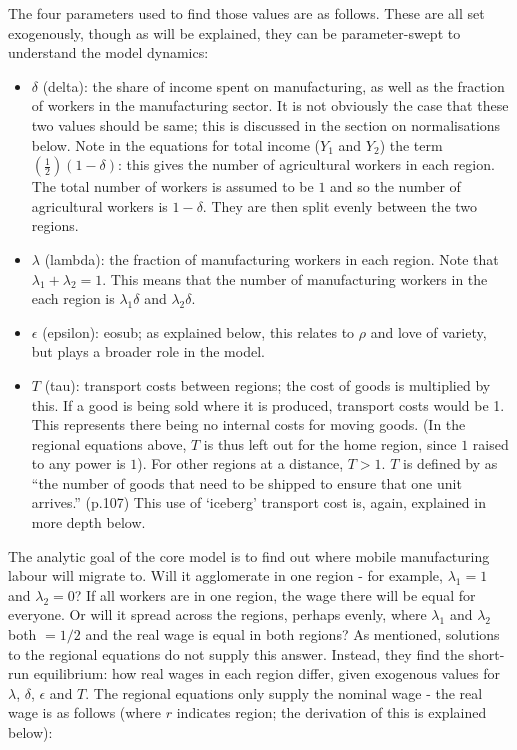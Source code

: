 The four parameters used to find those values are as follows. These are all set exogenously, though as will be explained, they can be parameter-swept to understand the model dynamics:

\begin{itemize}
	\item $\delta$ (delta): the share of income spent on manufacturing, as well as the fraction of workers in the manufacturing sector. It is not obviously the case that these two values should be same; this is discussed in the section on normalisations below. Note in the equations for total income ($Y_{1}$ and $Y_{2}$) the term $(\frac{1}{2})(1-\delta)$: this gives the number of agricultural workers in each region. The total number of workers is assumed to be $1$ and so the number of agricultural workers is $1-\delta$. They are then split evenly between the two regions. 
	\item $\lambda$ (lambda): the fraction of manufacturing workers in each region. Note that $\lambda_{1}+\lambda_{2}=1$.  This means that the number of manufacturing workers in the each region is $\lambda_{1}\delta$ and $\lambda_{2}\delta$. 
	\item $\epsilon$ (epsilon): \gls{eosub}; as explained below, this relates to $\rho$ and love of variety, but plays a broader role in the model.
	\item $T$ (tau): transport costs between regions; the cost of goods is multiplied by this. If a good is being sold where it is produced, transport costs would be 1. This represents there being no internal costs for moving goods. (In the regional equations above, $T$ is thus left out for the home region, since $1$ raised to any power is $1$). For other regions at a distance, $T>1$. $T$ is defined by \citeauthor{brakman_new_2009} as ``the number of goods that need to be shipped to ensure that one unit arrives.'' (p.107) This use of `iceberg' transport cost is, again, explained in more depth below.
\end{itemize}

The analytic goal of the core model is to find out where mobile manufacturing labour will migrate to. Will it agglomerate in one region - for example, $\lambda_{1}=1$ and $\lambda_{2}=0$? If all workers are in one region, the wage there will be equal for everyone. Or will it spread across the regions, perhaps evenly, where $\lambda_{1}$ and $\lambda_{2}$ both $=1/2$ and the real wage is equal in both regions? As mentioned, solutions to the regional equations do not supply this answer. Instead, they find the short-run equilibrium: how real wages in each region differ, given exogenous values for $\lambda$, $\delta$, $\epsilon$ and $T$. The regional equations only supply the nominal wage - the real wage is as follows (where $r$ indicates region; the derivation of this is explained below):

